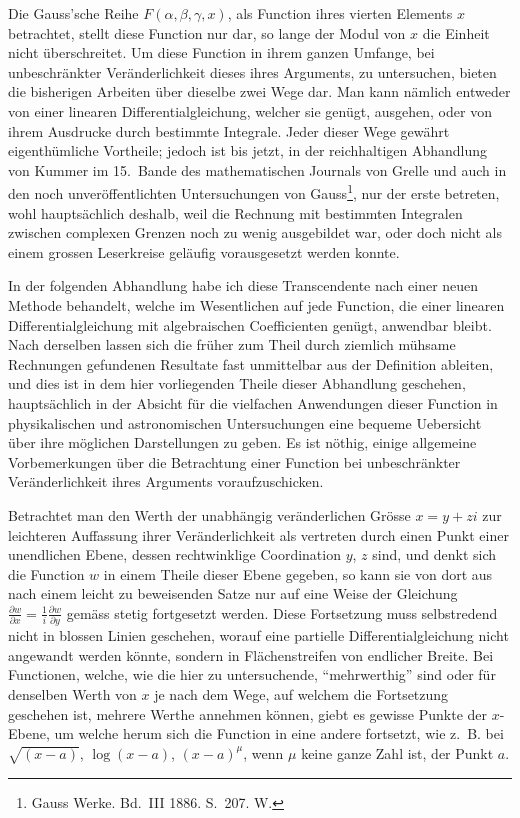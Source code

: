 \documentclass[12pt,a4paper]{book}
\theoremstyle{definition}
\theoremstyle{remark}
\begin{document}
Die Gauss'sche Reihe $F(\alpha, \beta, \gamma, x)$, als Function ihres vierten Elements $x$ betrachtet, stellt diese Function nur dar, so lange der Modul von $x$ die Einheit nicht überschreitet. Um diese Function in ihrem ganzen Umfange, bei unbeschränkter Veränderlichkeit dieses ihres Arguments, zu untersuchen, bieten die bisherigen Arbeiten über dieselbe zwei Wege dar. Man kann nämlich entweder von einer linearen Differentialgleichung, welcher sie genügt, ausgehen, oder von ihrem Ausdrucke durch bestimmte Integrale. Jeder dieser Wege gewährt eigenthümliche Vortheile; jedoch ist bis jetzt, in der reichhaltigen Abhandlung von Kummer im 15.\ Bande des mathematischen Journals von Grelle und auch in den noch unveröffentlichten Untersuchungen von Gauss\footnote{Gauss Werke. Bd.~III 1886. S.~207. W.}, nur der erste betreten, wohl hauptsächlich deshalb, weil die Rechnung mit bestimmten Integralen zwischen complexen Grenzen noch zu wenig ausgebildet war, oder doch nicht als einem grossen Leserkreise geläufig vorausgesetzt werden konnte.

In der folgenden Abhandlung habe ich diese Transcendente nach einer neuen Methode behandelt, welche im Wesentlichen auf jede Function, die einer linearen Differentialgleichung mit algebraischen Coefficienten genügt, anwendbar bleibt. Nach derselben lassen sich die früher zum Theil durch ziemlich mühsame Rechnungen gefundenen Resultate fast unmittelbar aus der Definition ableiten, und dies ist in dem hier vorliegenden Theile dieser Abhandlung geschehen, hauptsächlich in der Absicht für die vielfachen Anwendungen dieser Function in physikalischen und astronomischen Untersuchungen eine bequeme Uebersicht über ihre möglichen Darstellungen zu geben. Es ist nöthig, einige allgemeine Vorbemerkungen über die Betrachtung einer Function bei unbeschränkter Veränderlichkeit ihres Arguments voraufzuschicken.

Betrachtet man den Werth der unabhängig veränderlichen Grösse $x = y + zi$ zur leichteren Auffassung ihrer Veränderlichkeit als vertreten durch einen Punkt einer unendlichen Ebene, dessen rechtwinklige Coordination $y$, $z$ sind, und denkt sich die Function $w$ in einem Theile dieser Ebene gegeben, so kann sie von dort aus nach einem leicht zu beweisenden Satze nur auf eine Weise der Gleichung $\frac{\partial w}{\partial x} = \frac{1}{i}\frac{\partial w}{\partial y}$ gemäss stetig fortgesetzt werden. Diese Fortsetzung muss selbstredend nicht in blossen Linien geschehen, worauf eine partielle Differentialgleichung nicht angewandt werden könnte, sondern in Flächenstreifen von endlicher Breite. Bei Functionen, welche, wie die hier zu untersuchende, ``mehrwerthig'' sind oder für denselben Werth von $x$ je nach dem Wege, auf welchem die Fortsetzung geschehen ist, mehrere Werthe annehmen können, giebt es gewisse Punkte der $x$-Ebene, um welche herum sich die Function in eine andere fortsetzt, wie z.~B. bei $\sqrt{(x-a)}$, $\log(x-a)$, $(x-a)^\mu$, wenn $\mu$ keine ganze Zahl ist, der Punkt $a$.
\end{document}
